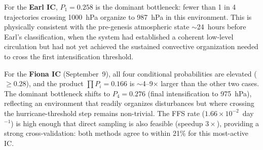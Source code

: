 \documentclass[11pt]{article}
\begin{document}
\begin{table}[htbp]
\centering
\caption{FFS statistics for three case-study initial conditions.
$\Phi_{A,0}$: flux rate. $P_i$: conditional crossing probability at interface $\lambda_i$.
$k^{\text{FFS}}$: full genesis rate (Eq.~\ref{eq:ffs_rate}). $k^{\text{direct}}$:
independent direct-sampling rate. Ratio: $k^{\text{FFS}}/k^{\text{direct}}$.
Speedup: enhancement over direct sampling for equivalent 20\% rate uncertainty.
Bottom row: statistics across all 98 ICs.}
\label{tab:results}
\end{table}

For the \textbf{Earl IC}, $P_1 = 0.258$ is the dominant bottleneck: fewer than 1 in 4
trajectories crossing 1000~hPa organize to 987~hPa in this environment. This is
physically consistent with the pre-genesis atmospheric state $\sim$24~hours before
Earl's classification, when the system had established a coherent low-level circulation
but had not yet achieved the sustained convective organization needed to cross the
first intensification threshold.

For the \textbf{Fiona IC} (September~9), all four conditional probabilities
are elevated ($\geq0.28$), and the product $\prod P_i = 0.166$ is $\sim$4--9$\times$
larger than the other two cases. The dominant bottleneck shifts to $P_4 = 0.276$
(final intensification to 975~hPa), reflecting an environment that readily organizes
disturbances but where crossing the hurricane-threshold step remains non-trivial.
The FFS rate ($1.66\times10^{-2}$~day$^{-1}$) is high enough that direct sampling
is also feasible (speedup $3\times$), providing a strong cross-validation: both methods
agree to within 21\% for this most-active IC.
\end{document}
